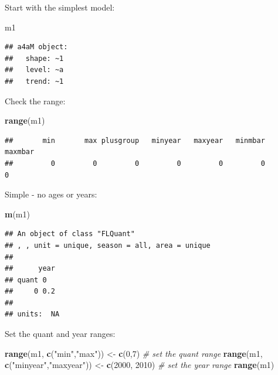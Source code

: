 \documentclass[
]{book}
\newenvironment{Shaded}{\begin{snugshade}}{\end{snugshade}}
\newcommand{\CommentTok}[1]{\textcolor[rgb]{0.56,0.35,0.01}{\textit{#1}}}
\newcommand{\DecValTok}[1]{\textcolor[rgb]{0.00,0.00,0.81}{#1}}
\newcommand{\FunctionTok}[1]{\textcolor[rgb]{0.13,0.29,0.53}{\textbf{#1}}}
\newcommand{\NormalTok}[1]{#1}
\newcommand{\OtherTok}[1]{\textcolor[rgb]{0.56,0.35,0.01}{#1}}
\newcommand{\StringTok}[1]{\textcolor[rgb]{0.31,0.60,0.02}{#1}}
\begin{document}
Start with the simplest model:

\begin{Shaded}
\begin{Highlighting}[]
\NormalTok{m1}
\end{Highlighting}
\end{Shaded}

\begin{verbatim}
## a4aM object:
##   shape: ~1
##   level: ~a
##   trend: ~1
\end{verbatim}

Check the range:

\begin{Shaded}
\begin{Highlighting}[]
\FunctionTok{range}\NormalTok{(m1)}
\end{Highlighting}
\end{Shaded}

\begin{verbatim}
##       min       max plusgroup   minyear   maxyear   minmbar   maxmbar 
##         0         0         0         0         0         0         0
\end{verbatim}

Simple - no ages or years:

\begin{Shaded}
\begin{Highlighting}[]
\FunctionTok{m}\NormalTok{(m1)}
\end{Highlighting}
\end{Shaded}

\begin{verbatim}
## An object of class "FLQuant"
## , , unit = unique, season = all, area = unique
## 
##      year
## quant 0  
##     0 0.2
## 
## units:  NA
\end{verbatim}

Set the quant and year ranges:

\begin{Shaded}
\begin{Highlighting}[]
\FunctionTok{range}\NormalTok{(m1, }\FunctionTok{c}\NormalTok{(}\StringTok{"min"}\NormalTok{,}\StringTok{"max"}\NormalTok{)) }\OtherTok{\textless{}{-}} \FunctionTok{c}\NormalTok{(}\DecValTok{0}\NormalTok{,}\DecValTok{7}\NormalTok{) }\CommentTok{\# set the quant range}
\FunctionTok{range}\NormalTok{(m1, }\FunctionTok{c}\NormalTok{(}\StringTok{"minyear"}\NormalTok{,}\StringTok{"maxyear"}\NormalTok{)) }\OtherTok{\textless{}{-}} \FunctionTok{c}\NormalTok{(}\DecValTok{2000}\NormalTok{, }\DecValTok{2010}\NormalTok{) }\CommentTok{\# set the year range}
\FunctionTok{range}\NormalTok{(m1)}
\end{Highlighting}
\end{Shaded}
\end{document}
